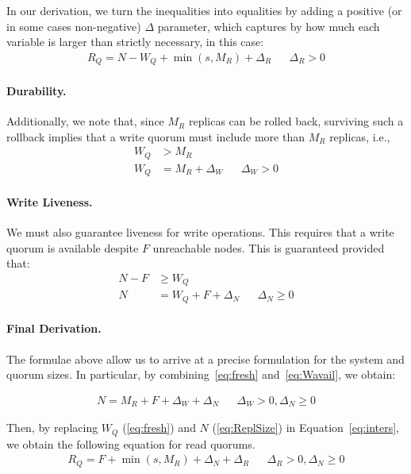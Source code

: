 In our derivation, we turn the inequalities into equalities by
adding a positive (or in some cases non-negative) $\Delta$
parameter, which captures by how much each variable is larger
than strictly necessary, in this case:
\begin{align} \label{eq:inters2}
  R_Q = N - W_Q + \min(s, M_R) + \Delta_R && \Delta_R > 0
\end{align}

\paragraph{Durability.}

Additionally, we note that, since $M_R$ replicas can be rolled
back, surviving such a rollback implies that a write quorum must
include more than $M_R$ replicas, i.e.,
\begin{align}
    W_Q &> M_R \nonumber \\
    W_Q &= M_R + \Delta_W && \Delta_W > 0 \label{eq:fresh}
\end{align}

\paragraph{Write Liveness.}
We must also guarantee liveness for write operations. This
requires that a write quorum is available despite $F$ unreachable
nodes. This is guaranteed provided that:
\begin{align}
    N - F &\geq W_Q \nonumber \\
    N &= W_Q + F + \Delta_N && \Delta_N \geq 0  \label{eq:Wavail}
\end{align}


\paragraph{Final Derivation.}
The formulae above allow us to arrive at a precise formulation
for the system and quorum sizes. In particular, by
combining~\ref{eq:fresh} and~\ref{eq:Wavail}, we obtain:

\begin{align} \label{eq:ReplSize}
  N = M_R + F + \Delta_W + \Delta_N && \Delta_W > 0, \Delta_N \geq 0
\end{align}

Then, by replacing $W_Q$ (\ref{eq:fresh}) and $N$
(\ref{eq:ReplSize}) in Equation~\ref{eq:inters}, we obtain the
following equation for read quorums.
\begin{align} \label{eq:rq_size}
  R_Q = F + \min(s, M_R) + \Delta_N + \Delta_R && \Delta_R > 0, \Delta_N \geq 0
\end{align}

